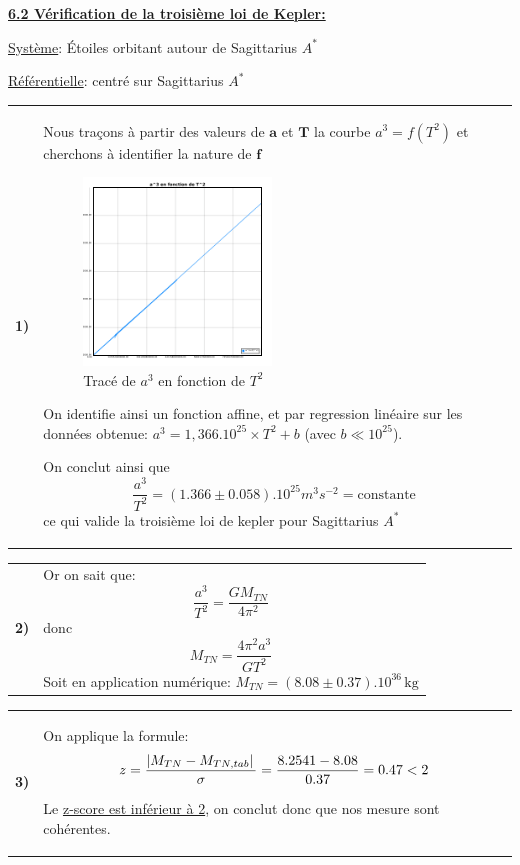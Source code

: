 \documentclass{article}
\newcommand{\expart}[1]
{
    \textbf{\underline{#1:}} \par 
}
\newcommand{\un}[1]{
    \,\text{#1}
}
\newcommand{\question}[2]
{
    \begin{tabularx}{\linewidth}{lX}
        \textbf{#1)} & {#2}
    \end{tabularx} 
}
\begin{document}
\expart{6.2 Vérification de la troisième loi de Kepler}

\underline{Système}: Étoiles orbitant autour de Sagittarius $A^*$

\underline{Référentielle}: centré sur Sagittarius $A^*$

\question{1}{
  Nous traçons à partir des valeurs de $\boldsymbol{a}$ et $\boldsymbol{T}$ la courbe $a^3=f(T^2)$ et cherchons à identifier la nature de $\boldsymbol{f}$
  \begin{figure}[H]
    \centering
    \includegraphics[width=50mm]{img/third_law.png}
    \caption{Tracé de $a^3$ en fonction de $T^2$}
  \end{figure}
  On identifie ainsi un fonction affine, et par regression linéaire sur les données obtenue: $a^3=1,366.10^{25}\times T^2+b$ (avec $b\ll10^{25}$).

  On conclut ainsi que 
  $$\boxed{\frac{a^3}{T^2}=(1.366\pm0.058).10^{25} m^3s^{-2}=\text{constante}}$$  ce qui valide la troisième loi de kepler pour Sagittarius $A^*$
}

\question{2}{
  Or on sait que:
  $$
  \frac{a^3}{T^2}=\frac{GM_{TN}}{4\pi^2}
  $$
  donc
  $$
  \boxed{M_{TN}=\frac{4\pi^2a^3}{GT^2}}
  $$
  Soit en application numérique: $\boxed{M_{TN}=(8.08\pm0.37).10^{36} \un{kg}}$
}

\question{3}{
  On applique la formule:
  $$
    z=\frac{\abs*{M_{TN}-M_{TN,tab}}}{\sigma}=\frac{8.2541-8.08}{0.37}=0.47 < 2
  $$

  Le \underline{z-score est inférieur à 2}, on conclut donc que nos mesure sont cohérentes.
}
\end{document}
